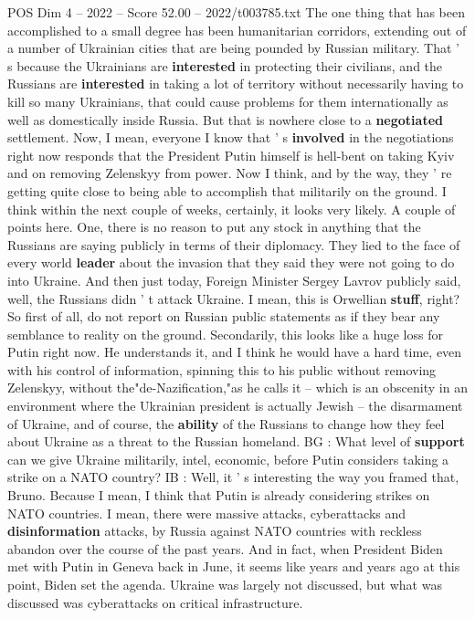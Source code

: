 \begin{textsample}{POS Dim 4 – 2022 – Score 52.00 – 2022/t003785.txt}
The one thing that has been accomplished to a small degree has been humanitarian corridors, extending out of a number of Ukrainian cities that are being pounded by Russian military.
That ' s because the Ukrainians are \textbf{interested} in protecting their civilians, and the Russians are \textbf{interested} in taking a lot of territory without necessarily having to kill so many Ukrainians, that could cause problems for them internationally as well as domestically inside Russia.
But that is nowhere close to a \textbf{negotiated} settlement.
Now, I mean, everyone I know that ' s \textbf{involved} in the negotiations right now responds that the President Putin himself is hell-bent on taking Kyiv and on removing Zelenskyy from power.
Now I think, and by the way, they ' re getting quite close to being able to accomplish that militarily on the ground.
I think within the next couple of weeks, certainly, it looks very likely.
A couple of points here.
One, there is no reason to put any stock in anything that the Russians are saying publicly in terms of their diplomacy.
They lied to the face of every world \textbf{leader} about the invasion that they said they were not going to do into Ukraine.
And then just today, Foreign Minister Sergey Lavrov publicly said, well, the Russians didn ' t attack Ukraine.
I mean, this is Orwellian \textbf{stuff}, right?
So first of all, do not report on Russian public statements as if they bear any semblance to reality on the ground.
Secondarily, this looks like a huge loss for Putin right now.
He understands it, and I think he would have a hard time, even with his control of information, spinning this to his public without removing Zelenskyy, without the"de-Nazification,"as he calls it -- which is an obscenity in an environment where the Ukrainian president is actually Jewish -- the disarmament of Ukraine, and of course, the \textbf{ability} of the Russians to change how they feel about Ukraine as a threat to the Russian homeland.
BG : What level of \textbf{support} can we give Ukraine militarily, intel, economic, before Putin considers taking a strike on a NATO country?
IB : Well, it ' s interesting the way you framed that, Bruno.
Because I mean, I think that Putin is already considering strikes on NATO countries.
I mean, there were massive attacks, cyberattacks and \textbf{disinformation} attacks, by Russia against NATO countries with reckless abandon over the course of the past years.
And in fact, when President Biden met with Putin in Geneva back in June, it seems like years and years ago at this point, Biden set the agenda.
Ukraine was largely not discussed, but what was discussed was cyberattacks on critical infrastructure.

\end{textsample}

